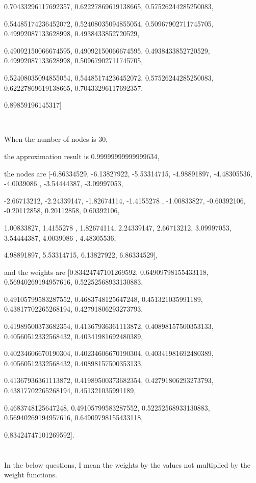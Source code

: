\documentclass{article}
\begin{document}
 0.70433296117692357,
 0.62227869619138665,
 0.57526244285250083,\par
 0.54485174236452072,
 0.52408035094855054,
 0.50967902711745705,
 0.49992087133628998,
 0.4938433852720529,\par
 0.49092150066674595,
 0.49092150066674595,
 0.4938433852720529,
 0.49992087133628998,
 0.50967902711745705,\par
 0.52408035094855054,
 0.54485174236452072,
 0.57526244285250083,
 0.62227869619138665,
 0.70433296117692357,\par
 0.89859196145317] \par
 		\ 
		\par
 		When the number of nodes is 30, \par
		the approximation result is 0.99999999999999634, \par
		the nodes are [-6.86334529, -6.13827922, -5.53314715, -4.98891897, -4.48305536,
        -4.0039086 , -3.54444387, -3.09997053, \par-2.66713212, -2.24339147,
        -1.82674114, -1.4155278 , -1.00833827, -0.60392106, -0.20112858,
         0.20112858,  0.60392106, \par 1.00833827,  1.4155278 ,  1.82674114,
         2.24339147,  2.66713212,  3.09997053,  3.54444387,  4.0039086 ,
         4.48305536,  \par 4.98891897,  5.53314715,  6.13827922,  6.86334529], \par
         and the weights are [0.83424747101269592,
 0.64909798155433118,
 0.56940269194957616,
 0.52252568933130883,\par
 0.49105799583287552,
 0.4683748125647248,
 0.451321035991189,
 0.43817702265268194,
 0.42791806293273793,\par
 0.41989500373682354,
 0.41367936361113872,
 0.40898157500353133,
 0.40560512332568432,
 0.40341981692480389,\par
 0.40234606670190304,
 0.40234606670190304,
 0.40341981692480389,
 0.40560512332568432,
 0.40898157500353133,\par
 0.41367936361113872,
 0.41989500373682354,
 0.42791806293273793,
 0.43817702265268194,
 0.451321035991189,\par
 0.4683748125647248,
 0.49105799583287552,
 0.52252568933130883,
 0.56940269194957616,
 0.64909798155433118,\par
 0.83424747101269592]. \par
         
\section{}
	
	In the below questions, I mean the weights by the values not multiplied by the weight functions.
\end{document}
